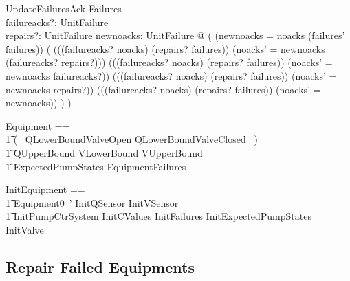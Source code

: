 \documentclass{report} %
\begin{document}
\begin{schema}{UpdateFailuresAck}
    \Delta Failures \\
    failureacks?: \power UnitFailure \\
    repairs?: \power UnitFailure
    \where
    \exists newnoacks: \power UnitFailure @ ( 
        (newnoacks = noacks \cup (failures' \setminus failures)) \land %
        (
            (((failureacks? \subseteq noacks) \land (repairs? \subseteq failures)) 
                \implies (noacks' = newnoacks \setminus (failureacks? \cup repairs?))) \land
            (((failureacks? \subseteq noacks) \land \lnot (repairs? \subseteq failures)) 
                \implies (noacks' = newnoacks \setminus failureacks?)) \land
            ((\lnot (failureacks? \subseteq noacks) \land (repairs? \subseteq failures))
                \implies (noacks' = newnoacks \setminus repairs?)) \land
            ((\lnot (failureacks? \subseteq noacks) \land \lnot (repairs? \subseteq failures)) 
                \implies (noacks' = newnoacks))
        )
    )
\end{schema}

\begin{zed}
  Equipment ==
  \\ %
  \t1
    (~ QLowerBoundValveOpen \lor QLowerBoundValveClosed ~) \land {} %
    \\ \t1 %
    QUpperBound \land VLowerBound \land VUpperBound \land {}
    \\ \t1 %
    ExpectedPumpStates \land EquipmentFailures
\end{zed}

\begin{zed}
  InitEquipment ==
  \\ %
  \t1
   Equipment0~' \land InitQSensor \land InitVSensor \land %
    \\ \t1 %
    InitPumpCtrSystem \land InitCValues \land InitFailures \land InitExpectedPumpStates \land InitValve
\end{zed}

\subsection{Repair Failed Equipments}
\end{document}
